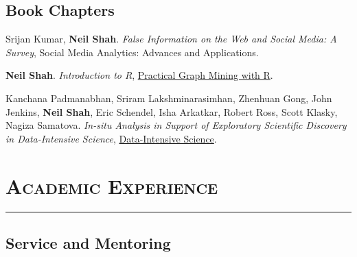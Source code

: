 \documentclass{article}
\newcommand{\HRule}{\rule{\linewidth}{0.5mm}}
\begin{document}
\subsection*{\bf {Book Chapters}}

\begin{etaremune}[itemsep=0pt,parsep=0pt]

\item Srijan Kumar, {\bf Neil Shah}.  \emph{False Information on the Web and Social Media: A Survey}, Social Media Analytics: Advances and Applications.


\item {\bf Neil Shah}. \emph{Introduction to R},
\href{http://www.crcpress.com/product/isbn/9781439860847}{Practical Graph Mining with R}.

\item Kanchana Padmanabhan, Sriram Lakshminarasimhan, Zhenhuan Gong, John Jenkins, {\bf Neil Shah}, Eric Schendel, Isha Arkatkar, Robert Ross, Scott Klasky, Nagiza Samatova. \emph{In-situ Analysis in Support of Exploratory Scientific Discovery in Data-Intensive Science},
\href{http://www.crcpress.com/product/isbn/9781439881392}{Data-Intensive Science}.

\end{etaremune}


\section*{\bf \textsc{Academic Experience}}
\vspace{-5mm}\HRule

\subsection*{\bf {Service and Mentoring}}
\end{document}

